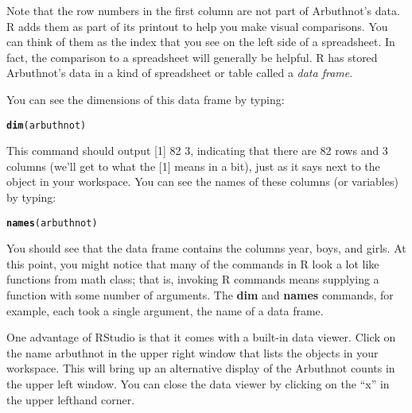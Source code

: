 \documentclass{article}\usepackage[]{graphicx}\usepackage[]{color}
\makeatletter
\newcommand{\hlstd}[1]{\textcolor[rgb]{0.345,0.345,0.345}{#1}}%
\newcommand{\hlkwd}[1]{\textcolor[rgb]{0.737,0.353,0.396}{\textbf{#1}}}%
\newenvironment{kframe}{%
 \def\at@end@of@kframe{}%
 \ifinner\ifhmode%
  \def\at@end@of@kframe{\end{minipage}}%
  \begin{minipage}{\columnwidth}%
 \fi\fi%
 \def\FrameCommand##1{\hskip\@totalleftmargin \hskip-\fboxsep
 \colorbox{shadecolor}{##1}\hskip-\fboxsep
     \hskip-\linewidth \hskip-\@totalleftmargin \hskip\columnwidth}%
 \MakeFramed {\advance\hsize-\width
   \@totalleftmargin\z@ \linewidth\hsize
   \@setminipage}}%
 {\par\unskip\endMakeFramed%
 \at@end@of@kframe}
\newenvironment{knitrout}{}{} %
\makeatother
\begin{document}
Note that the row numbers in the first column are not part of Arbuthnot's data. R adds them as part of its printout to help you make visual comparisons. You can think of them as the index that you see on the left side of a spreadsheet. In fact, the comparison to a spreadsheet will generally be helpful. R has stored Arbuthnot's data in a kind of spreadsheet or table called a \emph{data frame}.

You can see the dimensions of this data frame by typing:

\begin{knitrout}
\color{fgcolor}\begin{kframe}
\begin{alltt}
\hlkwd{dim}\hlstd{(arbuthnot)}
\end{alltt}
\end{kframe}
\end{knitrout}


This command should output \hlstd{[1] 82 3}, indicating that there are 82 rows and 3 columns (we'll get to what the \hlstd{[1]} means in a bit), just as it says next to the object in your workspace. You can see the names of these columns (or variables) by typing:

\begin{knitrout}
\color{fgcolor}\begin{kframe}
\begin{alltt}
\hlkwd{names}\hlstd{(arbuthnot)}
\end{alltt}
\end{kframe}
\end{knitrout}


You should see that the data frame contains the columns \hlstd{year},  \hlstd{boys}, and  \hlstd{girls}. At this point, you might notice that many of the commands in R look a lot like functions from math class; that is, invoking R commands means supplying a function with some number of arguments. The \hlkwd{dim} and \hlkwd{names} commands, for example, each took a single argument, the name of a data frame. 

One advantage of RStudio is that it comes with a built-in data viewer. Click on the name \hlstd{arbuthnot} in the upper right window that lists the objects in your workspace. This will bring up an alternative display of the Arbuthnot counts in the upper left window. You can close the data viewer by clicking on the ``x'' in the upper lefthand corner. 
\end{document}
